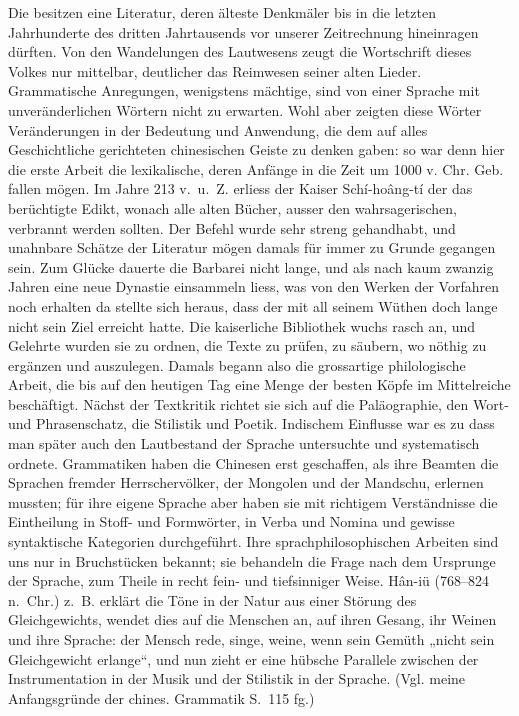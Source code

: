 \label{I.IV.chinesen}
Die  besitzen eine Literatur, deren älteste Denkmäler bis in die letzten Jahrhunderte des dritten Jahrtausends vor unserer Zeitrechnung hineinragen dürften. Von den Wandelungen des Lautwesens zeugt die Wortschrift dieses Volkes nur mittelbar, deutlicher das Reimwesen seiner alten Lieder. Grammatische Anregungen, wenigstens mächtige, sind von einer Sprache mit unveränderlichen Wörtern nicht zu erwarten. Wohl aber zeigten diese Wörter Veränderungen in der Bedeutung und Anwendung, die dem auf alles Geschichtliche gerichteten chinesischen Geiste zu denken gaben: so war denn hier die erste Arbeit die lexikalische, deren Anfänge in die Zeit um 1000 v. Chr. Geb. fallen mögen. Im Jahre 213 v.~u.~Z. erliess der Kaiser Schí-hoâng-tí der  das berüchtigte Edikt, wonach alle alten Bücher, ausser den wahrsagerischen, verbrannt werden sollten. Der Befehl wurde sehr streng gehandhabt, und unahnbare Schätze der Literatur mögen damals \label{fp.18} für immer zu Grunde gegangen sein. Zum Glücke dauerte die Barbarei nicht lange, und als nach kaum zwanzig Jahren eine neue Dynastie einsammeln liess, was von den Werken der Vorfahren noch erhalten  da stellte sich heraus, dass der  mit all seinem Wüthen doch lange nicht sein Ziel erreicht hatte. Die kaiserliche Bibliothek wuchs rasch an, und Gelehrte wurden  sie zu ordnen, die Texte zu prüfen, zu säubern, wo nöthig zu ergänzen und auszulegen. Damals begann also die grossartige philologische Arbeit, die bis auf den heutigen Tag eine Menge der besten Köpfe im Mittelreiche beschäftigt. Nächst der Textkritik richtet sie sich auf die Paläographie, den Wort- und Phrasenschatz, die Stilistik und Poetik. Indischem Einflusse war es zu  dass man später auch den Lautbestand der Sprache untersuchte und systematisch ordnete. Grammatiken haben die Chinesen erst geschaffen, als ihre Beamten die Sprachen fremder Herrschervölker, der Mongolen und der Mandschu, erlernen mussten; für ihre eigene Sprache aber haben sie mit richtigem Verständnisse die Eintheilung in Stoff- und Formwörter, in Verba und Nomina und gewisse syntaktische Kategorien durchgeführt. Ihre sprachphilosophischen Arbeiten sind uns nur in  Bruchstücken bekannt; sie behandeln die Frage nach dem Ursprunge der Sprache, zum Theile in recht fein- und tiefsinniger Weise. Hân-iü (768–824 n.~Chr.) z.~B. erklärt die Töne in der Natur aus einer Störung des Gleichgewichts, wendet dies auf die Menschen an, auf ihren Gesang, ihr Weinen und ihre Sprache: der Mensch rede, singe, weine, wenn sein Gemüth „nicht sein Gleichgewicht erlange“, und nun zieht er eine hübsche Parallele zwischen der Instrumentation in der Musik und der Stilistik in der Sprache. (Vgl. meine Anfangsgründe der chines. Grammatik S.~115 fg.)

